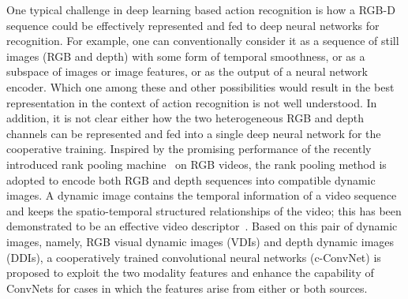 \documentclass[letterpaper]{article} %
\begin{document}
One typical challenge in deep learning based action recognition is how a RGB-D sequence could be effectively represented and fed to deep neural networks for recognition. For example, one can conventionally consider it as a sequence of still images (RGB and depth) with some form of temporal smoothness, or as a subspace of images or image features, or as the output of a neural network encoder. Which one among these and other possibilities would result in the best representation in the context of action recognition is not well understood. In addition, it is not clear either how the two heterogeneous RGB and depth channels can be represented and fed into a single deep neural network for the cooperative training.  Inspired by the promising performance of the recently introduced rank pooling machine~\cite{Fernando2015a,bilen2016dynamic} on RGB videos, the rank pooling method is adopted to encode both RGB and depth sequences into compatible dynamic images. A dynamic image contains the temporal information of a video sequence and keeps the spatio-temporal structured relationships of the video; this has been demonstrated to be an effective video descriptor~\cite{bilen2016dynamic}. Based on this pair of dynamic images, namely, RGB visual dynamic images (VDIs) and depth dynamic images (DDIs), a cooperatively trained convolutional neural networks (c-ConvNet) is proposed to exploit the two modality features and enhance the capability of ConvNets for cases in which the features arise from either or both sources.
\end{document}
